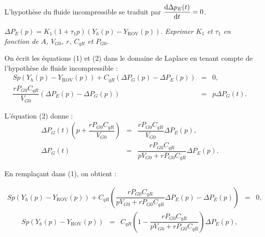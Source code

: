 \begin{multicols}{2}
%
%
%
%
% 
% 
%  
% 
%

L’hypothèse du fluide incompressible se traduit par $\dfrac{\text d\Delta p_E(t)}{\text dt}= 0$.


$\Delta P_E(p) = K_1(1+\tau_1 p)(Y_h(p)-Y_{\text{ROV}}(p)).$
\textit{Exprimer $K_1$ et $\tau_1$ en fonction de $A$, $V_{G0}$, $r$, $C_{qR}$ et $P_{G0}$.}
\ifprof
\begin{corrige}
On écrit les équations (1) et (2) dans le domaine de Laplace en tenant compte de l'hypothèse de fluide incompressible :
 \begin{eqnarray}
{Sp}\left( Y_h(p)-  Y_{\text{ROV}}(p)\right)+C_{qR}\left(\Delta P_G(p)-\Delta P_E(p)\right) &=&0, \\
\dfrac{rP_{G0}C_{qR}}{V_{G0}}\left(\Delta P_E(p)-\Delta P_G(p)\right) &=&p \Delta P_G(t).
\end{eqnarray}

L'équation (2) donne :
 \begin{eqnarray}
\Delta P_G(t)\left(p+\dfrac{rP_{G0}C_{qR}}{V_{G0}}\right)&=&\dfrac{rP_{G0}C_{qR}}{V_{G0}}\Delta P_E(p), \nonumber \\
\Delta P_G(t)&=&\dfrac{rP_{G0}C_{qR}}{pV_{G0}+{rP_{G0}C_{qR}}}\Delta P_E(p).\nonumber
\end{eqnarray}

En remplaçant dans (1), on obtient : 

 \begin{eqnarray}
{Sp}\left( Y_h(p)-  Y_{\text{ROV}}(p)\right)+C_{qR}\left(\dfrac{rP_{G0}C_{qR}}{pV_{G0}+{rP_{G0}C_{qR}}}\Delta P_E(p)-\Delta P_E(p)\right) &=&0, \nonumber
\end{eqnarray}
 \begin{eqnarray}
{Sp}\left( Y_h(p)-  Y_{\text{ROV}}(p)\right)&=&C_{qR}\left(1-\dfrac{rP_{G0}C_{qR}}{pV_{G0}+{rP_{G0}C_{qR}}}\right) \Delta P_E(p), \nonumber
\end{eqnarray}


\end{corrige}
\end{multicols}
